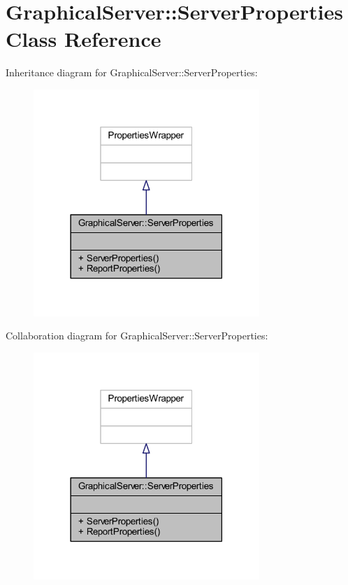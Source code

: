 \hypertarget{class_graphical_server_1_1_server_properties}{}\section{Graphical\+Server\+:\+:Server\+Properties Class Reference}
\label{class_graphical_server_1_1_server_properties}


Inheritance diagram for Graphical\+Server\+:\+:Server\+Properties\+:
\nopagebreak
\begin{figure}[H]
\begin{center}
\leavevmode
\includegraphics[width=242pt]{class_graphical_server_1_1_server_properties__inherit__graph}
\end{center}
\end{figure}


Collaboration diagram for Graphical\+Server\+:\+:Server\+Properties\+:
\nopagebreak
\begin{figure}[H]
\begin{center}
\leavevmode
\includegraphics[width=242pt]{class_graphical_server_1_1_server_properties__coll__graph}
\end{center}
\end{figure}
